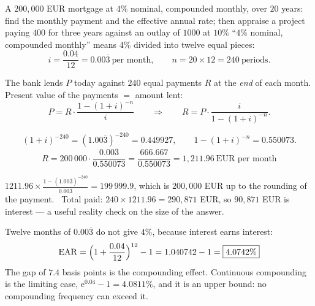 \begin{worked}{A $200{,}000$ EUR mortgage at $4\%$ nominal, compounded monthly, over $20$ years: find the monthly payment and the effective annual rate; then appraise a project paying $400$ for three years against an outlay of $1000$ at $10\%$}
``$4\%$ nominal, compounded monthly'' means $4\%$ divided into twelve equal
pieces:
\[
  i=\frac{0.04}{12}=0.00\overline{3}\ \text{per month},
  \qquad
  n=20\times12=240\ \text{periods}.
\]

The bank lends $P$ today against $240$ equal payments $R$ at the \emph{end}
of each month. Present value of the payments $=$ amount lent:
\[
  P=R\cdot\frac{1-(1+i)^{-n}}{i}
  \qquad\Longrightarrow\qquad
  R=P\cdot\frac{i}{1-(1+i)^{-n}} .
\]

\[
  (1+i)^{-240}=(1.00\overline{3})^{-240}=0.449927 ,
  \qquad
  1-(1+i)^{-n}=0.550073 .
\]
\[
  R=200\,000\cdot\frac{0.00\overline{3}}{0.550073}
   =\frac{666.667}{0.550073}
   =\boxed{1{,}211.96\ \text{EUR per month}}
\]

$1211.96\times\frac{1-(1.00\overline{3})^{-240}}{0.00\overline{3}}
=199\,999.9$, which is $200{,}000$ EUR up to the rounding of the payment.
\checkmark\ Total paid: $240\times1211.96=290{,}871$ EUR, so
$90{,}871$ EUR is interest --- a useful reality check on the size of the
answer.

Twelve months of $0.00\overline{3}$ do not give $4\%$, because interest
earns interest:
\[
  \mathrm{EAR}=\Bigl(1+\frac{0.04}{12}\Bigr)^{12}-1=1.040742-1=\boxed{4.0742\%}
\]
The gap of $7.4$ basis points is the compounding effect. Continuous
compounding is the limiting case, $\mathrm{e}^{0.04}-1=4.0811\%$, and it is
an upper bound: no compounding frequency can exceed it.


\end{worked}
